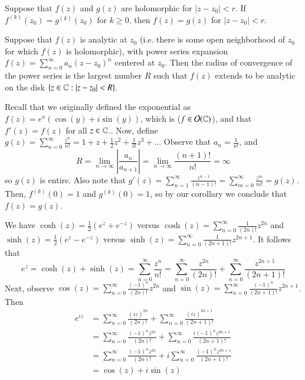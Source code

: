 \begin{corollary}
    Suppose that $f(z)$ and $g(z)$ are holomorphic for $|z-z_0| < r$. If $f^{(k)}(z_0) = g^{(k)}(z_0)$ for $k \geq 0$, then $f(z) = g(z)$ for $|z-z_0| < r$.
\end{corollary}

\begin{corollary}
    Suppose that $f(z)$ is analytic at $z_0$ (i.e. there is some open neighborhood of $z_0$ for which $f(z)$ is holomorphic), with power series expansion $f(z) = \sum_{n=0}^{\infty}a_n(z-z_0)^n$ centered at $z_0$. Then the radius of convergence of the power series is the largest number $R$ such that $f(z)$ extends to be analytic on the disk $\{z \in \mathbb C:|z-z_0| < R\}$.
\end{corollary}

\begin{example}
    Recall that we originally defined the exponential as $f(z) = e^x(\cos(y)+i\sin(y))$, which is  ($f \in \mathcal{O}(\mathbb C)$), and that $f'(z) = f(z)$ for all $z \in \mathbb C$.. Now, define $g(z) = \sum_{n=0}^{\infty}\frac{z^n}{n!} = 1+ z + \frac{1}{2}z^2+\frac{1}{3!}z^3+...$ Observe that $a_n = \frac{1}{n!}$, and \begin{equation*}
        R = \lim\limits_{n\rightarrow \infty} \left|\frac{a_n}{a_{n+1}}\right| = \lim\limits_{n\rightarrow \infty} \frac{(n+1)!}{n!} = \infty
    \end{equation*}
    so $g(z)$ is entire. Also note that $g'(z) = \sum_{n=1}^{\infty}\frac{z^{n-1}}{(n-1)!} = \sum_{m=0}^{\infty}\frac{z^m}{m!} = g(z)$. Then, $f^{(k)}(0) = 1$ and $g^{(k)}(0) = 1$, so by our corollary we conclude that $f(z) = g(z)$.
\end{example}

\begin{example}
    We have $\cosh(z) = \frac{1}{2}(e^z+e^{-z})$ versus $\cosh(z) = \sum_{n=0}^{\infty}\frac{1}{(2n)!}z^{2n}$ and $\sinh(z) = \frac{1}{2}(e^z - e^{-z})$ versus $\sinh(z) = \sum_{n=0}^{\infty}\frac{1}{(2n+1)!}z^{2n+1}$.  It follows that $$e^z = \cosh(z)+\sinh(z) = \sum_{n=0}^{\infty}\frac{z^n}{n!} = \sum_{n=0}^{\infty}\frac{z^{2n}}{(2n)!} + \sum_{n=0}^{\infty}\frac{z^{2n+1}}{(2n+1)!}$$
    Next, observe $\cos(z) = \sum_{n=0}^{\infty}\frac{(-1)^n}{(2n)!}z^{2n}$ and $\sin(z) =\sum_{n=0}^{\infty}\frac{(-1)^n}{(2n+1)!}z^{2n+1}$. Then \begin{align*}
        e^{iz} &= \sum_{n=0}^{\infty}\frac{(iz)^{2n}}{(2n)!} + \sum_{n=0}^{\infty}\frac{(iz)^{2n+1}}{(2n+1)!} \\
        &= \sum_{n=0}^{\infty}\frac{(-1)^nz^{2n}}{(2n)!} + \sum_{n=0}^{\infty}\frac{i(-1)^nz^{2n+1}}{(2n+1)!} \\
        &= \sum_{n=0}^{\infty}\frac{(-1)^nz^{2n}}{(2n)!} + i\sum_{n=0}^{\infty}\frac{(-1)^nz^{2n+1}}{(2n+1)!} \\
        &= \cos(z)+i\sin(z)
    \end{align*}
\end{example}



